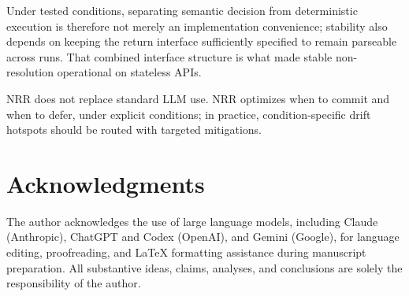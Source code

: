 \documentclass[11pt,a4paper]{article}
\begin{document}
Under tested conditions, separating semantic decision from deterministic
execution is therefore not merely an implementation convenience; stability also
depends on keeping the return interface sufficiently specified to remain
parseable across runs. That combined interface structure is what made stable
non-resolution operational on stateless APIs.

NRR does not replace standard LLM use. NRR optimizes when to commit and when to
defer, under explicit conditions; in practice, condition-specific drift hotspots
should be routed with targeted mitigations.

\section*{Acknowledgments}

The author acknowledges the use of large language models, including 
Claude (Anthropic), ChatGPT and Codex (OpenAI), and Gemini (Google), for 
language editing, proofreading, and LaTeX formatting assistance during 
manuscript preparation. All substantive ideas, claims, analyses, and 
conclusions are solely the responsibility of the author.
\end{document}

